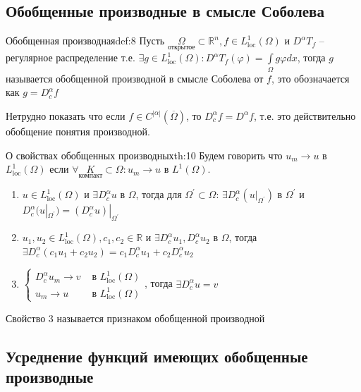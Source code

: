 \documentclass[12pt,a4paper]{article}
\newcommand{\intset}[1]{\int\limits_{#1}}
\newcommand{\Real}{\mathbb{R}}
\begin{document}
\subsection{Обобщенные производные в смысле Соболева}

\begin{definition}{Обобщенная производная}{def:8}
	Пусть $\underset{\text{открытое}}{\Omega} \subset \Real^n, f \in L_{\text{loc}}^1 (\Omega)$ и $D^\alpha T_f$ -- регулярное распределение т.е. $\exists g \in L_{\text{loc}}^1 (\Omega): D^\alpha T_f (\varphi) = \intset{\Omega}{g \varphi dx}$, тогда $g$ называется обобщенной производной в смысле Соболева от $f$, это обозначается как $g = D_c^\alpha f$
\end{definition}
Нетрудно показать что если $f \in C^{|\alpha|} (\overline{\Omega})$, то $D_c^\alpha f = D^\alpha f$, т.е. это действительно обобщение понятия производной.

\begin{theorem}{О свойствах обобщенных производных}{th:10}
	Будем говорить что $u_m \to u$ в $L_{\text{loc}}^1 (\Omega)$ если $\forall \underset{\text{компакт}}{K} \subset \Omega: u_m \to u \text{ в } L^1 (\Omega)$. 
	\begin{enumerate}
		\item $u \in L_{\text{loc}}^1 (\Omega)$ и $\exists D_c^\alpha u$ в $\Omega$, тогда для $\Omega^\prime \subset \Omega$: $\exists D_c^\alpha (u|_{\Omega^\prime}) \text{ в } \Omega^\prime$ и \\ $D_c^\alpha (u|_{\Omega^\prime}) = (D_c^\alpha u)|_{\Omega^\prime}$
		\item $u_1, u_2 \in L_{\text{loc}}^1 (\Omega), c_1, c_2 \in \Real$ и $\exists D_c^\alpha u_1, D_c^\alpha u_2$ в $\Omega$, тогда \\ $\exists D_c^\alpha (c_1 u_1 + c_2 u_2) = c_1 D_c^\alpha u_1 + c_2 D_c^\alpha u_2$
		\item $\begin{cases} 
				D_c^\alpha u_m \to v &\text{ в } L_{\text{loc}}^1 (\Omega) \\
				u_m \to u &\text{ в } L_{\text{loc}}^1 (\Omega) 
				\end{cases}$, тогда $\exists D_c^\alpha u = v$
	\end{enumerate}
	Свойство 3 называется признаком обобщенной производной
\end{theorem}

\subsection{Усреднение функций имеющих обобщенные производные}
\end{document}
